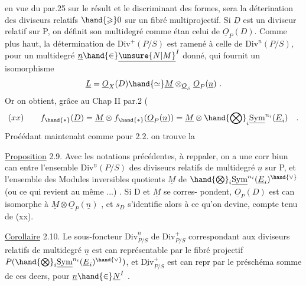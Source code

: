 
en vue du par.25 sur le résult  et le discriminant des formes, sera la
déterination des diviseurs relatifs $\hand{\geqslant} 0$ sur un fibré multiprojectif.
Si $\underline{D}$ est un diviseur relatif sur P, on définit son multidegré comme étan
celui de $\underline{O}_P(D)$. Comme plus haut, la détermination de $\mathrm{Div}^{+}(P/S)$ est ramené
à celle de $\mathrm{Div}^{\underline{n}}(P/S)$, pour un multidegré $\underline{n}\hand{\in}\underline{\unsure{N|M}}^{I}$ donné, qui fournit un
isomorphisme
\[ \underline{L} =\underline{O}_X(D) \hand{\simeq} \underline{M} \otimes_{\underline{O}_S} \underline{O}_P(\underline{n}) \ . \]
Or on obtient, grâce au Chap II par.2 (
\[ (xx) \qquad f_{\hand{*}}(\underline{D}) = \underline{M} \otimes f_{\hand{*}}(\underline{O}_P(\underline{n})) = \underline{M} \otimes \hand{\bigotimes}_i \underline{\mathrm{Sym}}^{n_i}(\underline{E}_i) \quad . \]
Proéédant maintenaht comme pour 2.2. on trouve la

\uline{Proposition} 2.9. Avec les notations précédentes, à reppaler, on a une
corr biun can entre l'ensemble $\mathrm{Div}^{\underline{n}}(P/S)$ des diviseurs relatifs de
multidegré $\underline{n}$ sur P, et l'ensemble des Modules inversibles quotients $\underline{M}$
de $\hand{\bigotimes}_i \underline{\mathrm{Sym}}^{n_i}(\underline{E}_i)^{\hand{\vee}}$ (ou ce qui revient au même ...) . Si D et $\underline{M}$ se corres-%
pondent, $\underline{O}_P(D)$ est can isomorphe à $\underline{M}\otimes\underline{O}_P(\underline{n})$ , et $s_D$ s'identifie alors
à ce qu'on devine, compte tenu de (xx).

\uline{Corollaire} 2.10. Le sous-foncteur $\mathrm{Div}^{\underline{n}}_{P/S}$ de $\mathrm{Div}^{+}_{P/S}$ correspondant aux
diviseurs relatifs de multidegré $\underline{n}$ est can représentable par le fibré
projectif $P(\hand{\bigotimes}_i \underline{\mathrm{Sym}}^{n_i}(\underline{E}_i)^{\hand{\vee}})$, et $\underline{\mathrm{Div}}^{+}_{P/S}$ est can repr par le préschéma
somme de ces deers, pour $\underline{n}\hand{\in}\underline{N}^{I}$ .

